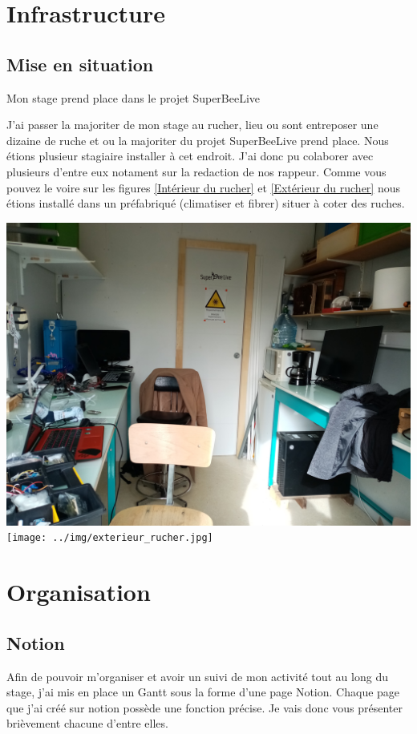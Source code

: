 \documentclass[11pt,french,a4paper]{article}
\begin{document}
\newpage
\section{Infrastructure}
\subsection{Mise en situation}
Mon stage prend place dans le projet SuperBeeLive 

J'ai passer la majoriter de mon stage au rucher, lieu ou sont entreposer une dizaine de ruche et ou la majoriter du projet SuperBeeLive prend place.
Nous étions plusieur stagiaire installer à cet endroit. J'ai donc pu colaborer avec plusieurs d'entre eux notament sur la redaction de nos rappeur. Comme vous pouvez le voire sur les figures \ref{Intérieur du rucher} et \ref{Extérieur du rucher}  nous étions installé dans un préfabriqué (climatiser et fibrer) situer à coter des ruches.

\begin{center}	
\includegraphics[scale=0.075]{../img/interieur_rucher.jpg}
\label{image1}
\texttt{[image: ../img/exterieur\_rucher.jpg]}
\label{image2}
\end{center}


\newpage
\section{Organisation}
\subsection{Notion}
Afin de pouvoir m'organiser et avoir un suivi de mon activité tout au long du stage, j'ai mis en place un Gantt sous la forme d'une page Notion.
Chaque page que j'ai créé sur notion possède une fonction précise. Je vais donc vous présenter brièvement chacune d'entre elles.
\end{document}
